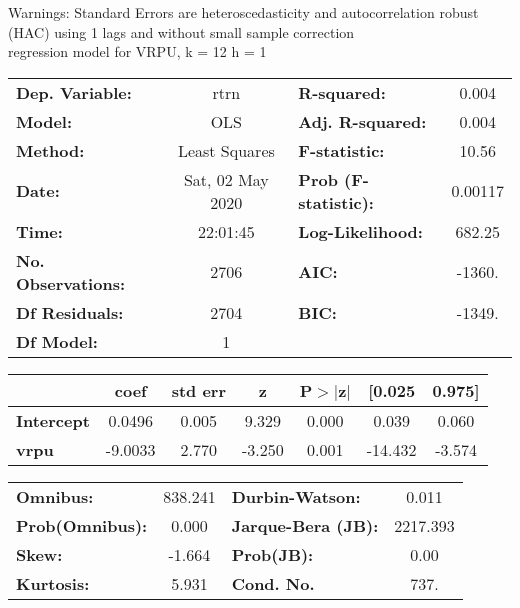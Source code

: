 Warnings: \newline
 [1] Standard Errors are heteroscedasticity and autocorrelation robust (HAC) using 1 lags and without small sample correction\\ 

regression model for VRPU, k = 12 h = 1\begin{center}
\begin{tabular}{lclc}
\toprule
\textbf{Dep. Variable:}    &       rtrn       & \textbf{  R-squared:         } &     0.004   \\
\textbf{Model:}            &       OLS        & \textbf{  Adj. R-squared:    } &     0.004   \\
\textbf{Method:}           &  Least Squares   & \textbf{  F-statistic:       } &     10.56   \\
\textbf{Date:}             & Sat, 02 May 2020 & \textbf{  Prob (F-statistic):} &  0.00117    \\
\textbf{Time:}             &     22:01:45     & \textbf{  Log-Likelihood:    } &    682.25   \\
\textbf{No. Observations:} &        2706      & \textbf{  AIC:               } &    -1360.   \\
\textbf{Df Residuals:}     &        2704      & \textbf{  BIC:               } &    -1349.   \\
\textbf{Df Model:}         &           1      & \textbf{                     } &             \\
\bottomrule
\end{tabular}
\begin{tabular}{lcccccc}
                   & \textbf{coef} & \textbf{std err} & \textbf{z} & \textbf{P$> |$z$|$} & \textbf{[0.025} & \textbf{0.975]}  \\
\midrule
\textbf{Intercept} &       0.0496  &        0.005     &     9.329  &         0.000        &        0.039    &        0.060     \\
\textbf{vrpu}      &      -9.0033  &        2.770     &    -3.250  &         0.001        &      -14.432    &       -3.574     \\
\bottomrule
\end{tabular}
\begin{tabular}{lclc}
\textbf{Omnibus:}       & 838.241 & \textbf{  Durbin-Watson:     } &    0.011  \\
\textbf{Prob(Omnibus):} &   0.000 & \textbf{  Jarque-Bera (JB):  } & 2217.393  \\
\textbf{Skew:}          &  -1.664 & \textbf{  Prob(JB):          } &     0.00  \\
\textbf{Kurtosis:}      &   5.931 & \textbf{  Cond. No.          } &     737.  \\
\bottomrule
\end{tabular}
\end{center}

